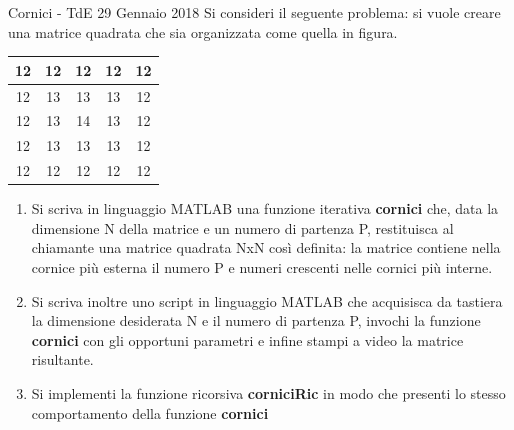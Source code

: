\documentclass[format=169, 10pt, handout]{beamer}
\begin{document}
\begin{frame}[allowframebreaks]{Cornici - TdE 29 Gennaio 2018}
Si consideri il seguente problema: si vuole creare una matrice quadrata che sia organizzata come quella in figura. 

\begin{tabular}{|c|c|c|c|c|}
	\hline 
	12 & 12 & 12 & 12 & 12 \\ 
	\hline 
	12 & 13 & 13 & 13 & 12 \\ 
	\hline 
	12 & 13 & 14 & 13 & 12 \\ 
	\hline 
	12 & 13 & 13 & 13 & 12 \\ 
	\hline 
	12 & 12 & 12 & 12 & 12 \\ 
	\hline 
\end{tabular} 

\begin{enumerate}
\item Si scriva in linguaggio MATLAB una funzione \alert{iterativa} \textbf{cornici} che, data la dimensione N della matrice e un numero di partenza P, restituisca al chiamante una matrice quadrata NxN così definita: la matrice contiene nella cornice più esterna il numero P e numeri crescenti nelle cornici più interne.

\item Si scriva inoltre uno script in linguaggio MATLAB che acquisisca da tastiera la dimensione desiderata N e il numero di partenza P, invochi la funzione \textbf{cornici} con gli opportuni parametri e infine stampi a video la matrice risultante.

\item Si implementi la funzione \alert{ricorsiva} \textbf{corniciRic} in modo che presenti lo stesso comportamento della funzione \textbf{cornici}
\end{enumerate}
\end{frame}
\end{document}
